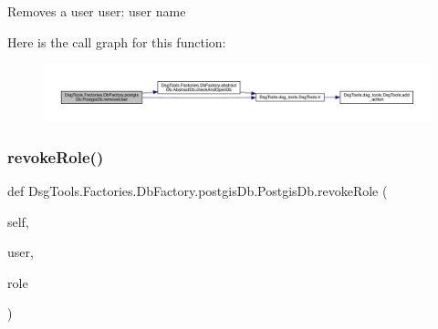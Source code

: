 \begin{DoxyVerb}Removes a user
user: user name
\end{DoxyVerb}
 Here is the call graph for this function\+:
\nopagebreak
\begin{figure}[H]
\begin{center}
\leavevmode
\includegraphics[width=350pt]{class_dsg_tools_1_1_factories_1_1_db_factory_1_1postgis_db_1_1_postgis_db_ae6f0406fe4595cd02ea974e1f6758ddf_cgraph}
\end{center}
\end{figure}
\mbox{\label{class_dsg_tools_1_1_factories_1_1_db_factory_1_1postgis_db_1_1_postgis_db_a2ad59cb20111f3290e69a630da3d5676}} 
\subsubsection{\texorpdfstring{revoke\+Role()}{revokeRole()}}
{\footnotesize\ttfamily def Dsg\+Tools.\+Factories.\+Db\+Factory.\+postgis\+Db.\+Postgis\+Db.\+revoke\+Role (\begin{DoxyParamCaption}\item[{}]{self,  }\item[{}]{user,  }\item[{}]{role }\end{DoxyParamCaption})}

